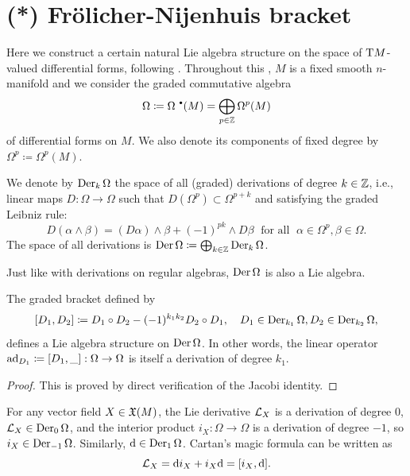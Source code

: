\section{(*) Fr\"olicher-Nijenhuis bracket}\label{sec: Frolicher}


Here we construct a certain natural Lie algebra structure on the space of $\mathrm{T} M$-valued differential forms, following \cite{Kolar}. Throughout this \sect, $M$ is a fixed smooth $n$-manifold and we consider the graded commutative algebra 
\[\Omega\coloneqq \Omega^{\smbullet}(M)=\bigoplus_{p\in\bbZ} \Omega^p(M)\] of differential forms on $M$. We also denote its components of fixed degree by $\Omega^p\coloneqq \Omega^p(M)$. 

\begin{defn}
    We denote by $\operatorname{Der}_k\Omega$ the space of all (graded) derivations of degree $k\in\mathbb{Z}$, i.e., linear maps $D:\Omega\to \Omega$ such that $D(\Omega^p)\subset \Omega^{p+k}$ and satisfying the graded Leibniz rule:
    \[D(\alpha\wedge\beta)=(D\alpha)\wedge\beta+(-1)^{pk}\wedge D\beta \;\text{ for all }\;\alpha\in\Omega^p,\beta\in\Omega.\]
    The space of all derivations is $\operatorname{Der}\Omega\coloneqq \bigoplus_{k\in\mathbb{Z}} \operatorname{Der}_k\Omega$.
\end{defn}

Just like with derivations on regular algebras, $\operatorname{Der}\Omega$ is also a Lie algebra.

\begin{lem}
    The graded bracket defined by
    \[[D_1,D_2]\coloneqq D_1\circ D_2-(-1)^{k_1k_2}D_2\circ D_1,\quad D_1\in\operatorname{Der}_{k_1}\Omega,D_2\in\operatorname{Der}_{k_2}\Omega,\]
    defines a Lie algebra structure on $\operatorname{Der}\Omega$. In other words, the linear operator $\mathrm{ad}_{D_1}\coloneqq [D_1,\_]:\Omega\to \Omega$ is itself a derivation of degree $k_1$.
\end{lem}
\begin{proof}
    This is proved by direct verification of the Jacobi identity.
\end{proof}

\begin{example}
    For any vector field $X\in\mathfrak{X}(M)$, the Lie derivative $\mathcal{L}_X$ is a derivation of degree $0$, $\mathcal{L}_X\in\operatorname{Der}_0\Omega$, and the interior product $i_X:\Omega\to \Omega$ is a derivation of degree $-1$, so $i_X\in\operatorname{Der}_{-1}\Omega$. Similarly, ${\mathrm{d}}\in\operatorname{Der}_1\Omega$. Cartan's magic formula can be written as 
    \[\mathcal{L}_X={\mathrm{d}} i_X+i_X {\mathrm{d}}=[i_X,{\mathrm{d}}].\]
\end{example}


